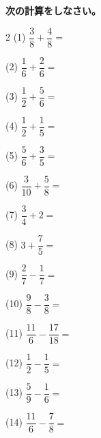 \documentclass[a4paper, 11pt]{ltjsarticle}
\begin{document}
\hspace{1em} {\Large \textbf{次の計算をしなさい。}}
\hfill


\vspace*{5ex}

\begin{multicols*}{2}
\noindent (1) \quad $\dfrac{3}{8}+\dfrac{4}{8} =$
\vspace*{\fill}

\noindent (2) \quad $\dfrac{1}{6}+\dfrac{2}{6} =$
\vspace*{\fill}

\noindent (3) \quad $\dfrac{1}{2}+\dfrac{5}{6} =$
\vspace*{\fill}

\noindent (4) \quad $\dfrac{1}{2}+\dfrac{1}{5} =$
\vspace*{\fill}

\noindent (5) \quad $\dfrac{5}{6}+\dfrac{3}{5} =$
\vspace*{\fill}

\noindent (6) \quad $\dfrac{3}{10}+\dfrac{5}{8} =$
\vspace*{\fill}

\noindent (7) \quad $\dfrac{3}{4}+2 =$
\vspace*{\fill}

\noindent (8) \quad $3+\dfrac{7}{5} =$
\vspace*{\fill}
\columnbreak

\noindent (9) \quad $\dfrac{2}{7}-\dfrac{1}{7} =$
\vspace*{\fill}

\noindent (10) \quad $\dfrac{9}{8}-\dfrac{3}{8} =$
\vspace*{\fill}

\noindent (11) \quad $\dfrac{11}{6}-\dfrac{17}{18} =$
\vspace*{\fill}

\noindent (12) \quad $\dfrac{1}{2}-\dfrac{1}{5} =$
\vspace*{\fill}

\noindent (13) \quad $\dfrac{5}{9}-\dfrac{1}{6} =$
\vspace*{\fill}

\noindent (14) \quad $\dfrac{11}{6}-\dfrac{7}{8} =$
\vspace*{\fill}


\end{multicols*}
\end{document}
